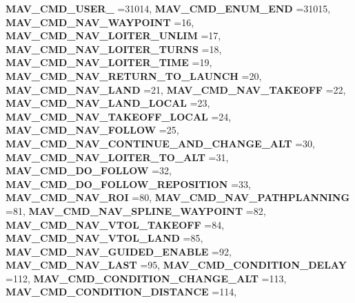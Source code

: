 \begin{DoxyCompactItemize}
\textbf{ M\+A\+V\+\_\+\+C\+M\+D\+\_\+\+U\+S\+E\+R\+\_} =31014, 
\textbf{ M\+A\+V\+\_\+\+C\+M\+D\+\_\+\+E\+N\+U\+M\+\_\+\+E\+ND} =31015, 
\newline
\textbf{ M\+A\+V\+\_\+\+C\+M\+D\+\_\+\+N\+A\+V\+\_\+\+W\+A\+Y\+P\+O\+I\+NT} =16, 
\textbf{ M\+A\+V\+\_\+\+C\+M\+D\+\_\+\+N\+A\+V\+\_\+\+L\+O\+I\+T\+E\+R\+\_\+\+U\+N\+L\+IM} =17, 
\textbf{ M\+A\+V\+\_\+\+C\+M\+D\+\_\+\+N\+A\+V\+\_\+\+L\+O\+I\+T\+E\+R\+\_\+\+T\+U\+R\+NS} =18, 
\textbf{ M\+A\+V\+\_\+\+C\+M\+D\+\_\+\+N\+A\+V\+\_\+\+L\+O\+I\+T\+E\+R\+\_\+\+T\+I\+ME} =19, 
\newline
\textbf{ M\+A\+V\+\_\+\+C\+M\+D\+\_\+\+N\+A\+V\+\_\+\+R\+E\+T\+U\+R\+N\+\_\+\+T\+O\+\_\+\+L\+A\+U\+N\+CH} =20, 
\textbf{ M\+A\+V\+\_\+\+C\+M\+D\+\_\+\+N\+A\+V\+\_\+\+L\+A\+ND} =21, 
\textbf{ M\+A\+V\+\_\+\+C\+M\+D\+\_\+\+N\+A\+V\+\_\+\+T\+A\+K\+E\+O\+FF} =22, 
\textbf{ M\+A\+V\+\_\+\+C\+M\+D\+\_\+\+N\+A\+V\+\_\+\+L\+A\+N\+D\+\_\+\+L\+O\+C\+AL} =23, 
\newline
\textbf{ M\+A\+V\+\_\+\+C\+M\+D\+\_\+\+N\+A\+V\+\_\+\+T\+A\+K\+E\+O\+F\+F\+\_\+\+L\+O\+C\+AL} =24, 
\textbf{ M\+A\+V\+\_\+\+C\+M\+D\+\_\+\+N\+A\+V\+\_\+\+F\+O\+L\+L\+OW} =25, 
\textbf{ M\+A\+V\+\_\+\+C\+M\+D\+\_\+\+N\+A\+V\+\_\+\+C\+O\+N\+T\+I\+N\+U\+E\+\_\+\+A\+N\+D\+\_\+\+C\+H\+A\+N\+G\+E\+\_\+\+A\+LT} =30, 
\textbf{ M\+A\+V\+\_\+\+C\+M\+D\+\_\+\+N\+A\+V\+\_\+\+L\+O\+I\+T\+E\+R\+\_\+\+T\+O\+\_\+\+A\+LT} =31, 
\newline
\textbf{ M\+A\+V\+\_\+\+C\+M\+D\+\_\+\+D\+O\+\_\+\+F\+O\+L\+L\+OW} =32, 
\textbf{ M\+A\+V\+\_\+\+C\+M\+D\+\_\+\+D\+O\+\_\+\+F\+O\+L\+L\+O\+W\+\_\+\+R\+E\+P\+O\+S\+I\+T\+I\+ON} =33, 
\textbf{ M\+A\+V\+\_\+\+C\+M\+D\+\_\+\+N\+A\+V\+\_\+\+R\+OI} =80, 
\textbf{ M\+A\+V\+\_\+\+C\+M\+D\+\_\+\+N\+A\+V\+\_\+\+P\+A\+T\+H\+P\+L\+A\+N\+N\+I\+NG} =81, 
\newline
\textbf{ M\+A\+V\+\_\+\+C\+M\+D\+\_\+\+N\+A\+V\+\_\+\+S\+P\+L\+I\+N\+E\+\_\+\+W\+A\+Y\+P\+O\+I\+NT} =82, 
\textbf{ M\+A\+V\+\_\+\+C\+M\+D\+\_\+\+N\+A\+V\+\_\+\+V\+T\+O\+L\+\_\+\+T\+A\+K\+E\+O\+FF} =84, 
\textbf{ M\+A\+V\+\_\+\+C\+M\+D\+\_\+\+N\+A\+V\+\_\+\+V\+T\+O\+L\+\_\+\+L\+A\+ND} =85, 
\textbf{ M\+A\+V\+\_\+\+C\+M\+D\+\_\+\+N\+A\+V\+\_\+\+G\+U\+I\+D\+E\+D\+\_\+\+E\+N\+A\+B\+LE} =92, 
\newline
\textbf{ M\+A\+V\+\_\+\+C\+M\+D\+\_\+\+N\+A\+V\+\_\+\+L\+A\+ST} =95, 
\textbf{ M\+A\+V\+\_\+\+C\+M\+D\+\_\+\+C\+O\+N\+D\+I\+T\+I\+O\+N\+\_\+\+D\+E\+L\+AY} =112, 
\textbf{ M\+A\+V\+\_\+\+C\+M\+D\+\_\+\+C\+O\+N\+D\+I\+T\+I\+O\+N\+\_\+\+C\+H\+A\+N\+G\+E\+\_\+\+A\+LT} =113, 
\textbf{ M\+A\+V\+\_\+\+C\+M\+D\+\_\+\+C\+O\+N\+D\+I\+T\+I\+O\+N\+\_\+\+D\+I\+S\+T\+A\+N\+CE} =114, 

\end{DoxyCompactItemize}
